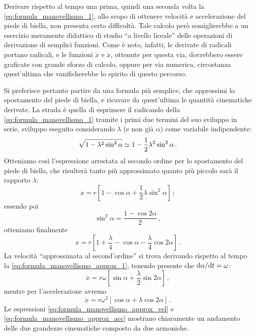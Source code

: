 \noindent Derivare rispetto al tempo una prima, quindi una seconda volta
la \ref{eq:formula_manovellismo_1},
allo scopo di ottenere velocit\`a e accelerazione del piede di biella,
non presenta certo difficolt\`a. Tale calcolo per\`o somiglierebbe
a un esercizio
meramente didattico di studio ``a livello liceale'' delle operazioni di
derivazione di semplici funzioni.
Come \`e noto, infatti, le derivate di radicali portano radicali, e 
le funzioni $\dot x$ e $\ddot x$, ottenute per questa via, dovrebbero
essere graficate con grande sforzo di calcolo,
oppure per via numerica, circostanza quest'ultima che vanificherebbe lo spirito
di questo percorso.


\noindent Si preferisce pertanto partire da una formula pi\`u semplice,
che approssimi lo spostamento del piede di biella, e ricavare da
quest'ultima le quantit\`a cinematiche derivate.
La strada \`e quella di esprimere il radicando della \ref{eq:formula_manovellismo_1} tramite i primi due termini del suo sviluppo in
serie, sviluppo eseguito considerando $\lambda$
(e non gi\`a $\alpha$) come variabile indipendente:
\begin{equation}
\sqrt{1-\lambda^2 \sin^2\alpha}\simeq 1 - \frac{1}{2} \lambda^2\sin^2\alpha \,.\notag
\end{equation}
\noindent Otteniamo cos\`i l'espressione arrestata al secondo ordine per lo
spostamento del piede di biella,
che risulter\`a tanto pi\`u  approssimato quanto pi\`u piccolo sar\`a
il rapporto $\lambda$:
\begin{equation}
x= r[1 - \cos \alpha + \frac{1}{2} \lambda \sin^2\alpha]\,;
\label{eq:formula_manovellismo_approx0}
\end{equation}
\noindent essendo poi
\begin{equation}
\sin^2\alpha= \frac{1 - \cos 2\alpha}{2}\,,
\label{eq:formula_manovellismo_approx}
\end{equation}
\noindent otteniamo finalmente   
\begin{equation}
x= r[1 +\frac{\lambda}{4} - \cos \alpha - \frac{\lambda}{4} \cos 2\alpha]\,.
\label{eq:formula_manovellismo_approx_1}
\end{equation}
\noindent La velocit\`a ``approssimata al second'ordine'' si
trova derivando rispetto al tempo la \ref{eq:formula_manovellismo_approx_1},
tenendo presente che ${\rm d}\alpha/{\rm d}t=\omega$:
\begin{equation}
\dot x= r\omega[\sin \alpha +\frac{\lambda}{2} \sin 2\alpha]\,,
\label{eq:formula_manovellismo_approx_vel}
\end{equation}
\noindent mentre per l'accelerazione avremo
\begin{equation}
\ddot x= r\omega^2[\cos \alpha +\lambda \cos 2\alpha]\,.
\label{eq:formula_manovellismo_approx_acc}
\end{equation}
\noindent Le espressioni \ref{eq:formula_manovellismo_approx_vel} e \ref{eq:formula_manovellismo_approx_acc}
mostrano chiaramente un andamento delle due grandezze cinematiche
composto da due armoniche.


